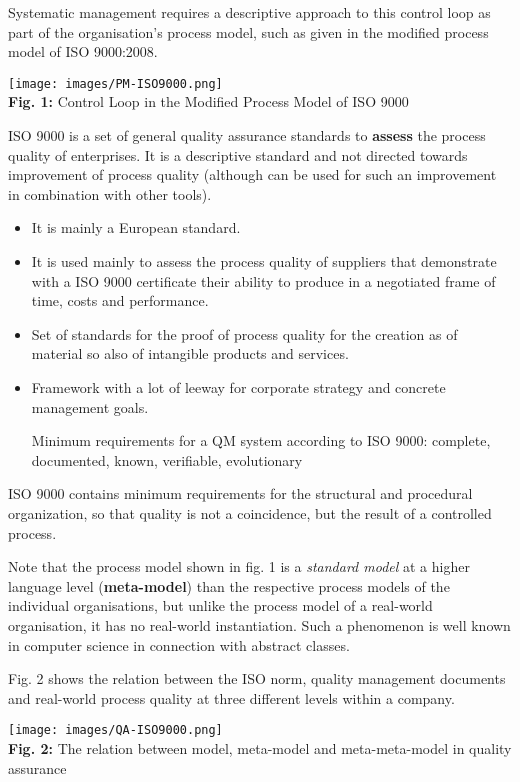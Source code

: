 \documentclass[11pt,a4paper]{article}
\begin{document}
Systematic management requires a descriptive approach to this control loop as
part of the organisation's process model, such as given in the modified
process model of ISO 9000:2008.
\begin{center}
  \texttt{[image: images/PM-ISO9000.png]}\\
  \textbf{Fig. 1:} Control Loop in the Modified Process Model of ISO 9000
\end{center}
ISO 9000 is a set of general quality assurance standards to \textbf{assess}
the process quality of enterprises. It is a descriptive standard and not
directed towards improvement of process quality (although can be used for such
an improvement in combination with other tools).
\begin {itemize} 
\item It is mainly a European standard.
\item It is used mainly to assess the process quality of suppliers that
  demonstrate with a ISO 9000 certificate their ability to produce in a
  negotiated frame of time, costs and performance. 
\item Set of standards for the proof of process quality for the creation as of
  material so also of intangible products and services.
\item Framework with a lot of leeway for corporate strategy and concrete
  management goals.

  Minimum requirements for a QM system according to ISO 9000: complete,
  documented, known, verifiable, evolutionary
\end {itemize}
ISO 9000 contains minimum requirements for the structural and procedural
organization, so that quality is not a coincidence, but the result of a
controlled process.

Note that the process model shown in fig. 1 is a \emph{standard model} at a
higher language level (\textbf{meta-model}) than the respective process models
of the individual organisations, but unlike the process model of a real-world
organisation, it has no real-world instantiation. Such a phenomenon is well
known in computer science in connection with abstract classes.

Fig. 2 shows the relation between the ISO norm, quality management documents
and real-world process quality at three different levels within a company.  

\begin{center}
  \texttt{[image: images/QA-ISO9000.png]}\\
  \textbf{Fig. 2:} The relation between model, meta-model and meta-meta-model
  in quality assurance
\end{center}
\end{document}
